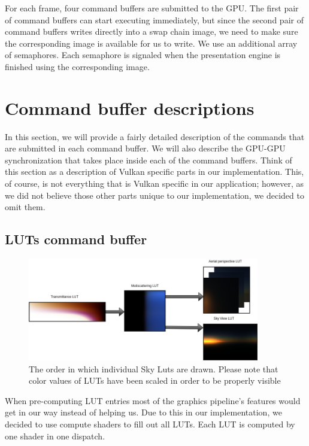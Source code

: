 \documentclass{ctuthesis}
\begin{document}
For each frame, four command buffers are submitted to the GPU. The first pair of command buffers can start executing immediately, 
but since the second pair of command buffers writes directly into a swap chain image, we need to make sure the
corresponding image is available for us to write. We use an additional array of semaphores. Each semaphore is signaled
when the presentation engine is finished using the corresponding image.


\section{Command buffer descriptions}
In this section, we will provide a fairly detailed description of the commands that are submitted 
in each command buffer. We will also describe the GPU-GPU synchronization that takes place inside
each of the command buffers. Think of this section as a description of Vulkan specific
parts in our implementation. This, of course, is not everything that is Vulkan specific in our
application; however, as we did not believe those other parts unique to our implementation, we 
decided to omit them.

\subsection{LUTs command buffer}
\begin{figure}
    \centering
    \includegraphics[width=0.9\textwidth]{media/LUT_execution_order.png}
    \caption[Sky LUT draw order]{The order in which individual Sky Luts are drawn. Please note that color values of
    LUTs have been scaled in order to be properly visible}
    \label{fig:LUTs execution order}
\end{figure}

When pre-computing LUT entries most of the graphics pipeline's features
would get in our way instead of helping us. Due to this in our implementation, we
decided to use compute shaders to fill out all LUTs. Each LUT is computed by one
shader in one dispatch. 
\end{document}

